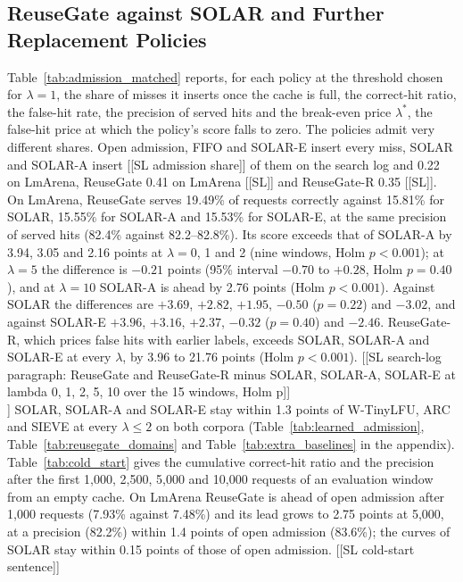 \subsection{ReuseGate against SOLAR and Further Replacement Policies}
\label{subsec:admission_baselines_results}
Table~\ref{tab:admission_matched} reports, for each policy at the threshold chosen for $\lambda=1$, the share of misses it inserts once the cache is full, the correct-hit ratio, the false-hit rate, the precision of served hits and the break-even price $\lambda^{*}$, the false-hit price at which the policy's score falls to zero. The policies admit very different shares. Open admission, FIFO and SOLAR-E insert every miss, SOLAR and SOLAR-A insert [[SL admission share]] of them on the search log and 0.22 on LmArena, ReuseGate 0.41 on LmArena [[SL]] and ReuseGate-R 0.35 [[SL]].
\\
On LmArena, ReuseGate serves 19.49\% of requests correctly against 15.81\% for SOLAR, 15.55\% for SOLAR-A and 15.53\% for SOLAR-E, at the same precision of served hits (82.4\% against 82.2--82.8\%). Its score exceeds that of SOLAR-A by 3.94, 3.05 and 2.16 points at $\lambda=0$, 1 and 2 (nine windows, Holm $p<0.001$); at $\lambda=5$ the difference is $-0.21$ points (95\% interval $-0.70$ to $+0.28$, Holm $p=0.40$), and at $\lambda=10$ SOLAR-A is ahead by 2.76 points (Holm $p<0.001$). Against SOLAR the differences are $+3.69$, $+2.82$, $+1.95$, $-0.50$ ($p=0.22$) and $-3.02$, and against SOLAR-E $+3.96$, $+3.16$, $+2.37$, $-0.32$ ($p=0.40$) and $-2.46$. ReuseGate-R, which prices false hits with earlier labels, exceeds SOLAR, SOLAR-A and SOLAR-E at every $\lambda$, by 3.96 to 21.76 points (Holm $p<0.001$). [[SL search-log paragraph: ReuseGate and ReuseGate-R minus SOLAR, SOLAR-A, SOLAR-E at lambda 0, 1, 2, 5, 10 over the 15 windows, Holm p]]
\\
[[SL verify]] SOLAR, SOLAR-A and SOLAR-E stay within 1.3 points of W-TinyLFU, ARC and SIEVE at every $\lambda\le2$ on both corpora (Table~\ref{tab:learned_admission}, Table~\ref{tab:reusegate_domains} and Table~\ref{tab:extra_baselines} in the appendix). Table~\ref{tab:cold_start} gives the cumulative correct-hit ratio and the precision after the first 1,000, 2,500, 5,000 and 10,000 requests of an evaluation window from an empty cache. On LmArena ReuseGate is ahead of open admission after 1,000 requests (7.93\% against 7.48\%) and its lead grows to 2.75 points at 5,000, at a precision (82.2\%) within 1.4 points of open admission (83.6\%); the curves of SOLAR stay within 0.15 points of those of open admission. [[SL cold-start sentence]]

